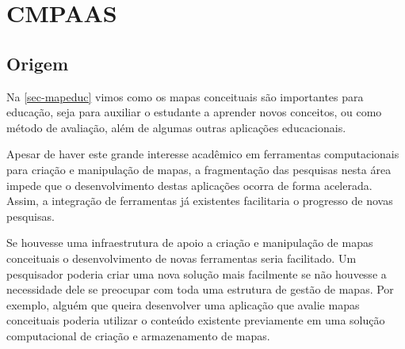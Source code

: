 \documentclass[
	12pt,				%
	openright,			%
	oneside,			%
	a4paper,			%
	english,			%
	french,				%
	spanish,			%
	brazil				%
	]{abntex2}
\begin{document}
\begin{table}[htb]
\end{table}




\chapter{CMPAAS}
\section{Origem}

Na \autoref{sec-mapeduc} vimos como os mapas conceituais são importantes para educação, seja para auxiliar o estudante a aprender novos conceitos, ou como método de avaliação, além de algumas outras aplicações educacionais. 

Apesar de haver este grande interesse acadêmico em ferramentas computacionais para criação e manipulação de mapas, a fragmentação das pesquisas nesta área impede que o desenvolvimento destas aplicações ocorra de forma acelerada. Assim, a integração de ferramentas já existentes facilitaria o progresso de novas pesquisas.

Se houvesse uma infraestrutura de apoio a criação e manipulação de mapas conceituais o desenvolvimento de novas ferramentas seria facilitado. Um pesquisador poderia criar uma nova solução mais facilmente se não houvesse a necessidade dele se preocupar com toda uma estrutura de gestão de mapas. Por exemplo, alguém que queira desenvolver uma aplicação que avalie mapas conceituais poderia utilizar o conteúdo existente previamente em uma solução computacional de criação e armazenamento de mapas.
\end{document}
